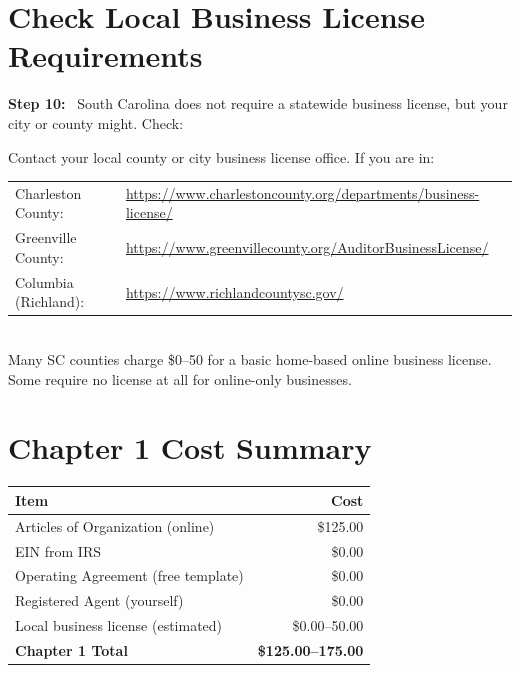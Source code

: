 \documentclass[12pt, letterpaper, oneside]{book}
\newcommand{\step}[1]{\noindent\textbf{\textcolor{primary}{Step #1:}}~}
\begin{document}
\section{Check Local Business License Requirements}

\step{10} South Carolina does not require a statewide business license, but your city or county might. Check:
\begin{actionbox}
Contact your local county or city business license office. If you are in:\\[4pt]
\begin{tabular}{ll}
  Charleston County: & \url{https://www.charlestoncounty.org/departments/business-license/} \\
  Greenville County: & \url{https://www.greenvillecounty.org/AuditorBusinessLicense/} \\
  Columbia (Richland): & \url{https://www.richlandcountysc.gov/} \\
\end{tabular}\\[8pt]
Many SC counties charge \$0--50 for a basic home-based online business license. Some require no license at all for online-only businesses.
\end{actionbox}

\section{Chapter 1 Cost Summary}

\begin{table}[H]
\centering
\begin{tabular}{lr}
\toprule
\textbf{Item} & \textbf{Cost} \\
\midrule
Articles of Organization (online) & \$125.00 \\
EIN from IRS & \$0.00 \\
Operating Agreement (free template) & \$0.00 \\
Registered Agent (yourself) & \$0.00 \\
Local business license (estimated) & \$0.00--50.00 \\
\midrule
\textbf{Chapter 1 Total} & \textbf{\$125.00--175.00} \\
\bottomrule
\end{tabular}
\end{table}


\end{document}
